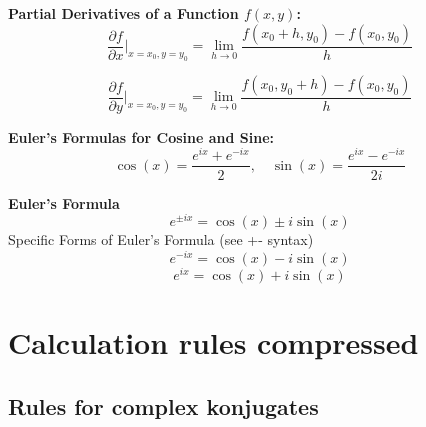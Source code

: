 \documentclass[a4paper,8pt,fleqn]{article}
\begin{document}
\begin{multicols}{3}
\begin{minipage}{\linewidth}
\end{minipage}
\begin{minipage}{\linewidth}

\textbf{Partial Derivatives of a Function $f(x, y)$:} \\[-0.2cm]
\[
\frac{\partial f}{\partial x} \Bigg|_{x=x_0, y=y_0} = \lim_{h \to 0} \frac{f(x_0 + h, y_0) - f(x_0, y_0)}{h}
\]

\[
\frac{\partial f}{\partial y} \Bigg|_{x=x_0, y=y_0} = \lim_{h \to 0} \frac{f(x_0, y_0 + h) - f(x_0, y_0)}{h}
\]

\end{minipage}

\begin{minipage}{\linewidth}
\textbf{Euler's Formulas for Cosine and Sine:}
\[
\cos(x) = \frac{e^{ix} + e^{-ix}}{2}, \quad \sin(x) = \frac{e^{ix} - e^{-ix}}{2i}
\]
\end{minipage}

 \begin{minipage}{\linewidth}

\textbf{Euler's Formula} \\
\[
    e^{\pm ix} = \cos(x) \pm i \sin(x)
\]
Specific Forms of Euler's Formula (see +- syntax)
\[
    e^{-ix} = \cos(x) - i \sin(x)
\]
\[
    e^{ix} = \cos(x) + i \sin(x)
\]



\end{minipage}











\newpage
\section{Calculation rules compressed}


\begin{minipage}{\linewidth}
\subsection{Rules for complex konjugates}


\end{minipage}
\end{multicols}
\end{document}
